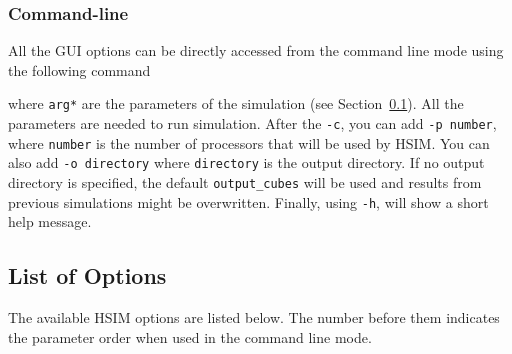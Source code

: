 \documentclass[12pt]{report}
\begin{document}
\subsubsection{Command-line}

All the GUI options can be directly accessed from the command line mode using the following command


where \texttt{arg*} are the parameters of the simulation (see Section~\ref{s:list_options}). All the parameters are needed to run simulation. After the \texttt{-c}, you can add \texttt{-p number}, where \texttt{number} is the number of processors that will be used by HSIM. You can also add \texttt{-o directory} where \texttt{directory} is the output directory. If no output directory is specified, the default \texttt{output\_cubes} will be used and results from previous simulations might be overwritten. Finally, using \texttt{-h}, will show a short help message.


\subsection{List of Options}\label{s:list_options}

The available HSIM options are listed below. The number before them indicates the parameter order when used in the command line mode.
\end{document}
